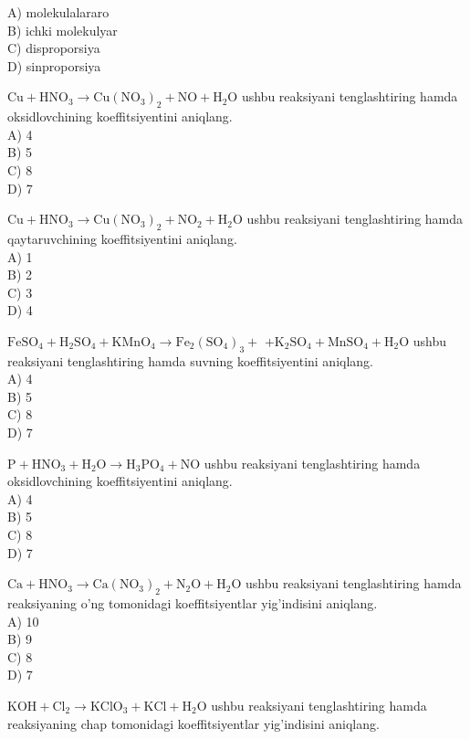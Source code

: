A) molekulalararo\\
B) ichki molekulyar\\
C) disproporsiya\\
D) sinproporsiya
  \item $\mathrm{Cu}+\mathrm{HNO}_{3} \rightarrow \mathrm{Cu}\left(\mathrm{NO}_{3}\right)_{2}+\mathrm{NO}+\mathrm{H}_{2} \mathrm{O}$ ushbu reaksiyani tenglashtiring hamda oksidlovchining koeffitsiyentini aniqlang.\\
A) 4\\
B) 5\\
C) 8\\
D) 7
  \item $\mathrm{Cu}+\mathrm{HNO}_{3} \rightarrow \mathrm{Cu}\left(\mathrm{NO}_{3}\right)_{2}+\mathrm{NO}_{2}+\mathrm{H}_{2} \mathrm{O}$ ushbu reaksiyani tenglashtiring hamda qaytaruvchining koeffitsiyentini aniqlang.\\
A) 1\\
B) 2\\
C) 3\\
D) 4
  \item $\mathrm{FeSO}_{4}+\mathrm{H}_{2} \mathrm{SO}_{4}+\mathrm{KMnO}_{4} \rightarrow \mathrm{Fe}_{2}\left(\mathrm{SO}_{4}\right)_{3}+$ $+\mathrm{K}_{2} \mathrm{SO}_{4}+\mathrm{MnSO}_{4}+\mathrm{H}_{2} \mathrm{O}$ ushbu reaksiyani tenglashtiring hamda suvning koeffitsiyentini aniqlang.\\
A) 4\\
B) 5\\
C) 8\\
D) 7
  \item $\mathrm{P}+\mathrm{HNO}_{3}+\mathrm{H}_{2} \mathrm{O} \rightarrow \mathrm{H}_{3} \mathrm{PO}_{4}+\mathrm{NO}$ ushbu reaksiyani tenglashtiring hamda oksidlovchining koeffitsiyentini aniqlang.\\
A) 4\\
B) 5\\
C) 8\\
D) 7
  \item $\mathrm{Ca}+\mathrm{HNO}_{3} \rightarrow \mathrm{Ca}\left(\mathrm{NO}_{3}\right)_{2}+\mathrm{N}_{2} \mathrm{O}+\mathrm{H}_{2} \mathrm{O}$ ushbu reaksiyani tenglashtiring hamda reaksiyaning o'ng tomonidagi koeffitsiyentlar yig'indisini aniqlang.\\
A) 10\\
B) 9\\
C) 8\\
D) 7
  \item $\mathrm{KOH}+\mathrm{Cl}_{2} \rightarrow \mathrm{KClO}_{3}+\mathrm{KCl}+\mathrm{H}_{2} \mathrm{O}$ ushbu reaksiyani tenglashtiring hamda reaksiyaning chap tomonidagi koeffitsiyentlar yig'indisini aniqlang.\\
